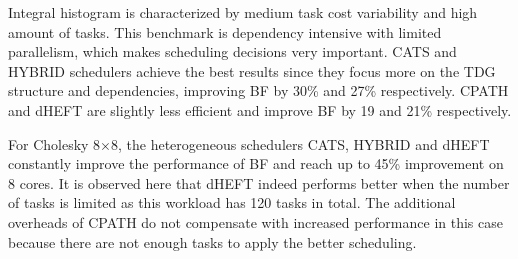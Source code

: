Integral histogram is characterized by medium task cost variability and high amount of tasks.
This benchmark is dependency intensive with limited parallelism, which makes scheduling decisions very important.
CATS and HYBRID schedulers achieve the best results since they focus more on the TDG structure and dependencies, improving BF by 30\% and 27\% respectively.
CPATH and dHEFT are slightly less efficient and improve BF by 19 and 21\% respectively.


For Cholesky 8$\times$8, the heterogeneous schedulers CATS, HYBRID and dHEFT constantly improve the performance of BF and reach up to 45\% improvement on 8 cores.
It is observed here that dHEFT indeed performs better when the number of tasks is limited as this workload has 120 tasks in total.
The additional overheads of CPATH do not compensate with increased performance in this case because there are not enough tasks to apply the better scheduling.


